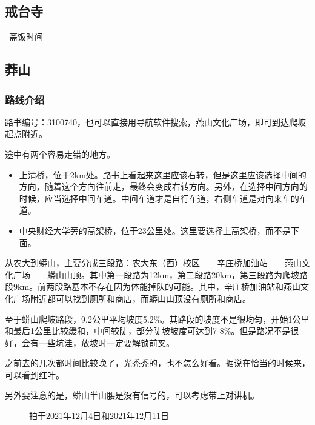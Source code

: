 \documentclass{ctexbook}
\begin{document}
\subsection{戒台寺}
--斋饭时间
\newpage
\subsection{莽山}
\label{subsec:莽山}
\subsubsection{路线介绍}
路书编号：3100740，也可以直接用导航软件搜索，燕山文化广场，即可到达爬坡起点附近。

途中有两个容易走错的地方。
\begin{itemize}
    \item 上清桥，位于2km处。路书上看起来这里应该右转，但是这里应该选择中间的方向，随着这个方向往前走，最终会变成右转方向。另外，在选择中间方向的时候，应当选择中间车道。中间车道才是自行车道，右侧车道是对向来车的车道。
    \item 中央财经大学旁的高架桥，位于23公里处。这里要选择上高架桥，而不是下面。
\end{itemize}

从农大到蟒山，主要分成三段路：农大东（西）校区——辛庄桥加油站——燕山文化广场——蟒山山顶。其中第一段路为12km，第二段路20km，第三段路为爬坡路段9km。前两段路基本不存在因为体能掉队的可能。其中，辛庄桥加油站和燕山文化广场附近都可以找到厕所和商店，而蟒山山顶没有厕所和商店。

至于蟒山爬坡路段，9.2公里平均坡度5.2\%。其路段的坡度不是很均匀，开始1公里和最后1公里比较缓和，中间较陡，部分陡坡坡度可达到7-8\%。但是路况不是很好，会有一些坑洼，放坡时一定要解锁前叉。

之前去的几次都时间比较晚了，光秃秃的，也不怎么好看。据说在恰当的时候来，可以看到红叶。

另外要注意的是，蟒山半山腰是没有信号的，可以考虑带上对讲机。
\begin{figure}[!htb]
    \centering
       \quad 
        \caption{拍于2021年12月4日和2021年12月11日}
  \end{figure}
\end{document}
